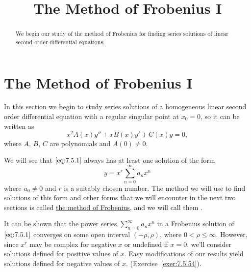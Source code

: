 \documentclass{ximera}
\title{The Method of Frobenius I}%
\begin{document}
\begin{abstract}
We begin our study of the method of Frobenius for finding series solutions of linear second order differential equations.
\end{abstract}

\maketitle

\section*{The Method of Frobenius I}

In this section we begin to study  series solutions of a
homogeneous linear second order differential equation with a regular
singular point at $x_0=0$, so it can be written as
\begin{equation} \label{eq:7.5.1}
x^2A(x)y''+xB(x)y'+C(x)y=0,
\end{equation}
where $A$, $B$, $C$ are polynomials and $A(0)\neq 0$.

We will see that $\eqref{eq:7.5.1}$ always has at least one solution of
the form
$$
y=x^r\sum_{n=0}^\infty a_nx^n
$$
where $a_0\ne0$ and $r$ is a suitably chosen number.
The method we will use to find solutions of this form and other forms that we will encounter in the next two sections is called
\href{https://en.wikipedia.org/wiki/Frobenius_method}{the method of Frobenius},
and we will call them
.

It can be shown that the power series $\sum_{n=0}^\infty a_nx^n$ in a
Frobenius solution of $\eqref{eq:7.5.1}$ converges on some open interval
$(-\rho,\rho)$, where $0<\rho\leq\infty$. However, since $x^r$ may be
complex for negative $x$ or undefined if $x=0$, we'll consider
solutions defined for positive values of $x$. Easy modifications of
our results yield solutions defined for negative values of $x$.
(Exercise~\ref{exer:7.5.54}).
\end{document}
